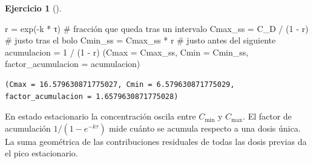 \documentclass[
  spanish,
  a4paper,
]{scrreport}
\newenvironment{Shaded}{\begin{snugshade}}{\end{snugshade}}
\newcommand{\CommentTok}[1]{\textcolor[rgb]{0.37,0.37,0.37}{#1}}
\newcommand{\FloatTok}[1]{\textcolor[rgb]{0.68,0.00,0.00}{#1}}
\newcommand{\FunctionTok}[1]{\textcolor[rgb]{0.28,0.35,0.67}{#1}}
\newcommand{\NormalTok}[1]{\textcolor[rgb]{0.00,0.23,0.31}{#1}}
\newcommand{\OperatorTok}[1]{\textcolor[rgb]{0.37,0.37,0.37}{#1}}
\theoremstyle{definition}
\newtheorem{exercise}{Ejercicio}[chapter]
\theoremstyle{remark}
\begin{document}
\begin{exercise}[]
\begin{enumerate}
  \begin{tcolorbox}[enhanced jigsaw, arc=.35mm, bottomrule=.15mm, bottomtitle=1mm, breakable, colback=white, colbacktitle=quarto-callout-tip-color!10!white, colframe=quarto-callout-tip-color-frame, coltitle=black, left=2mm, leftrule=.75mm, opacityback=0, opacitybacktitle=0.6, rightrule=.15mm, title=\textcolor{quarto-callout-tip-color}{\faLightbulb}\hspace{0.5em}{Solución}, titlerule=0mm, toprule=.15mm, toptitle=1mm]

\begin{Shaded}
\begin{Highlighting}[]
\NormalTok{r }\OperatorTok{=} \FunctionTok{exp}\NormalTok{(}\OperatorTok{{-}}\NormalTok{k }\OperatorTok{*}\NormalTok{ τ)                 }\CommentTok{\# fracción que queda tras un intervalo}
\NormalTok{Cmax\_ss }\OperatorTok{=}\NormalTok{ C\_D }\OperatorTok{/}\NormalTok{ (}\FloatTok{1} \OperatorTok{{-}}\NormalTok{ r)         }\CommentTok{\# justo tras el bolo}
\NormalTok{Cmin\_ss }\OperatorTok{=}\NormalTok{ Cmax\_ss }\OperatorTok{*}\NormalTok{ r           }\CommentTok{\# justo antes del siguiente}
\NormalTok{acumulacion }\OperatorTok{=} \FloatTok{1} \OperatorTok{/}\NormalTok{ (}\FloatTok{1} \OperatorTok{{-}}\NormalTok{ r)}
\NormalTok{(Cmax }\OperatorTok{=}\NormalTok{ Cmax\_ss, Cmin }\OperatorTok{=}\NormalTok{ Cmin\_ss, factor\_acumulacion }\OperatorTok{=}\NormalTok{ acumulacion)}
\end{Highlighting}
\end{Shaded}

\begin{verbatim}
(Cmax = 16.579630871775027, Cmin = 6.579630871775029, factor_acumulacion = 1.6579630871775028)
\end{verbatim}

  En estado estacionario la concentración oscila entre \(C_{\min}\) y
  \(C_{\max}\). El factor de acumulación \(1/(1-e^{-k\tau})\) mide
  cuánto se acumula respecto a una dosis única. La suma geométrica de
  las contribuciones residuales de todas las dosis previas da el pico
  estacionario.

  \end{tcolorbox}
\end{enumerate}

\end{exercise}
\end{document}
